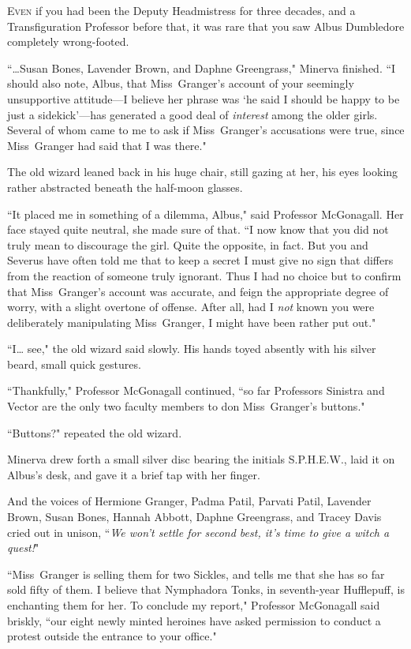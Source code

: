 
\lettrine{E}{ven} if you had been the Deputy Headmistress for three decades, and a Transfiguration Professor before that, it was rare that you saw Albus Dumbledore completely wrong-footed.

``{\ldots}Susan Bones, Lavender Brown, and Daphne Greengrass," Minerva finished. ``I should also note, Albus, that Miss~Granger's account of your seemingly unsupportive attitude—I believe her phrase was `he said I should be happy to be just a sidekick'—has generated a good deal of \emph{interest} among the older girls. Several of whom came to me to ask if Miss~Granger's accusations were true, since Miss~Granger had said that I was there."

The old wizard leaned back in his huge chair, still gazing at her, his eyes looking rather abstracted beneath the half-moon glasses.

``It placed me in something of a dilemma, Albus," said Professor McGonagall. Her face stayed quite neutral, she made sure of that. ``I now know that you did not truly mean to discourage the girl. Quite the opposite, in fact. But you and Severus have often told me that to keep a secret I must give no sign that differs from the reaction of someone truly ignorant. Thus I had no choice but to confirm that Miss~Granger's account was accurate, and feign the appropriate degree of worry, with a slight overtone of offense. After all, had I \emph{not} known you were deliberately manipulating Miss~Granger, I might have been rather put out."

``I{\ldots} see," the old wizard said slowly. His hands toyed absently with his silver beard, small quick gestures.

``Thankfully," Professor McGonagall continued, ``so far Professors Sinistra and Vector are the only two faculty members to don Miss~Granger's buttons."

``Buttons?" repeated the old wizard.

Minerva drew forth a small silver disc bearing the initials S.P.H.E.W., laid it on Albus's desk, and gave it a brief tap with her finger.

And the voices of Hermione Granger, Padma Patil, Parvati Patil, Lavender Brown, Susan Bones, Hannah Abbott, Daphne Greengrass, and Tracey Davis cried out in unison, ``\emph{We won't settle for second best, it's time to give a witch a quest!}"

``Miss~Granger is selling them for two Sickles, and tells me that she has so far sold fifty of them. I believe that Nymphadora Tonks, in seventh-year Hufflepuff, is enchanting them for her. To conclude my report," Professor McGonagall said briskly, ``our eight newly minted heroines have asked permission to conduct a protest outside the entrance to your office."

